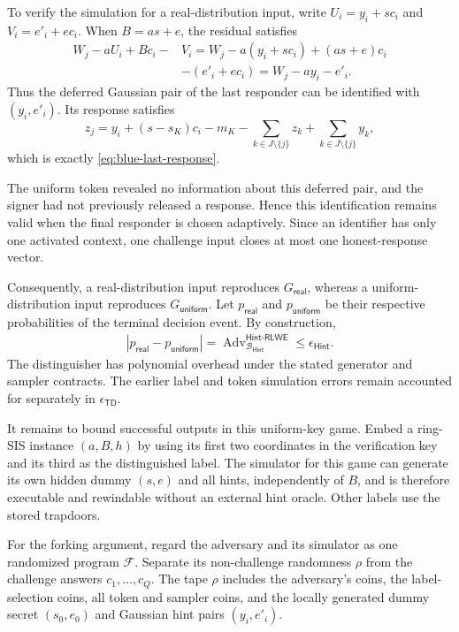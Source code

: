 \documentclass[lettersize,journal]{IEEEtran}
\begin{document}
To verify the simulation for a real-distribution input,
write $U_i=y_i+sc_i$ and $V_i=e'_i+ec_i$.
When $B=as+e$, the residual satisfies
\[
\begin{aligned}
W_j-aU_i+Bc_i-&V_i
  =W_j-a(y_i+sc_i)+(as+e)c_i\\
  &-(e'_i+ec_i) =W_j-ay_i-e'_i.
\end{aligned}
\]
Thus the deferred Gaussian pair of the last responder
can be identified with $(y_i,e'_i)$.
Its response satisfies
\[
z_j
=y_i+(s-s_K)c_i-m_K
 -\sum_{k\in J\setminus\{j\}}z_k
 +\sum_{k\in J\setminus\{j\}}y_k,
\]
which is exactly \eqref{eq:blue-last-response}.

The uniform token revealed no information about this deferred pair,
and the signer had not previously released a response.
Hence this identification remains valid when the final responder
is chosen adaptively.
Since an identifier has only one activated context,
one challenge input closes at most one honest-response vector.

Consequently, a real-distribution input reproduces
$G_{\mathsf{real}}$, whereas a uniform-distribution input
reproduces $G_{\mathsf{uniform}}$.
Let $p_{\mathsf{real}}$ and $p_{\mathsf{uniform}}$
be their respective probabilities of the terminal decision event.
By construction,
\[
\begin{aligned}
|p_{\mathsf{real}}-p_{\mathsf{uniform}}|
=
\operatorname{Adv}^{\mathsf{Hint\text{-}RLWE}}
_{\mathcal B_{\mathsf{Hint}}} \leq \epsilon_{\mathsf{Hint}}.
\end{aligned}
\]
The distinguisher has polynomial overhead under the stated
generator and sampler contracts.
The earlier label and token simulation errors remain
accounted for separately in $\epsilon_{\mathsf{TD}}$.

It remains to bound successful outputs in this uniform-key game. Embed a
ring-SIS instance $(a,B,h)$ by using its first two coordinates in the
verification key and its third as the distinguished label. The simulator
for this game can generate its own hidden dummy $(s,e)$ and all hints,
independently of $B$, and is therefore executable and rewindable without
an external hint oracle. Other labels use the stored trapdoors.

For the forking argument, regard the adversary and its simulator
as one randomized program $\mathcal F$.
Separate its non-challenge randomness $\rho$ from the challenge
answers $c_1,\ldots,c_Q$.
The tape $\rho$ includes the adversary's coins, the label-selection
coins, all token and sampler coins, and the locally generated
dummy secret $(s_0,e_0)$ and Gaussian hint pairs $(y_i,e'_i)$.
\end{document}
